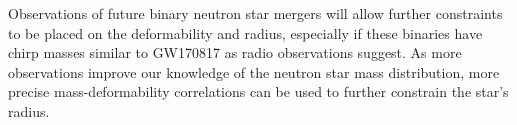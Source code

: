 Observations of future binary neutron star mergers will allow further constraints to be placed on the deformability and radius, especially if these binaries have chirp masses similar to GW170817 as radio observations suggest. As more observations improve our knowledge of the neutron star mass distribution, more precise mass-deformability correlations can be used to further constrain the star's radius.





%